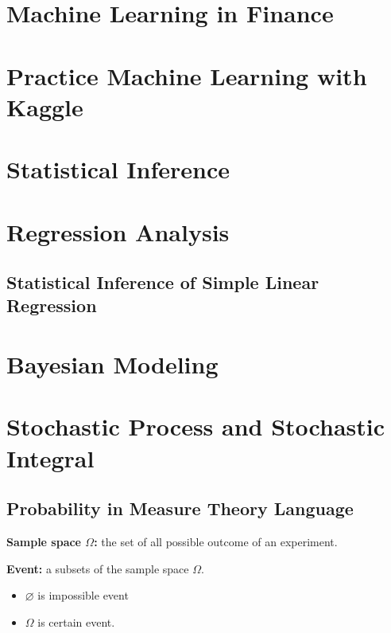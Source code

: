 \documentclass[
  letterpaper,
  DIV=11,
  numbers=noendperiod]{scrreprt}
\providecommand{\tightlist}{%
  \setlength{\itemsep}{0pt}\setlength{\parskip}{0pt}}
\theoremstyle{definition}
\theoremstyle{plain}
\theoremstyle{plain}
\theoremstyle{definition}
\theoremstyle{plain}
\theoremstyle{plain}
\theoremstyle{remark}
\begin{document}
\part{Machine Learning in Finance}

\part{Practice Machine Learning with Kaggle}

\part{Statistical Inference}

\part{Regression Analysis}

\chapter{Statistical Inference of Simple Linear
Regression}\label{statistical-inference-of-simple-linear-regression}

\part{Bayesian Modeling}

\part{Stochastic Process and Stochastic Integral}

\chapter{Probability in Measure Theory
Language}\label{probability-in-measure-theory-language}

\textbf{Sample space \(\Omega\):} the set of all possible outcome of an
experiment.

\textbf{Event:} a subsets of the sample space \(\Omega\).

\begin{itemize}
\tightlist
\item
  \(\varnothing\) is impossible event
\item
  \(\Omega\) is certain event.
\end{itemize}
\end{document}
